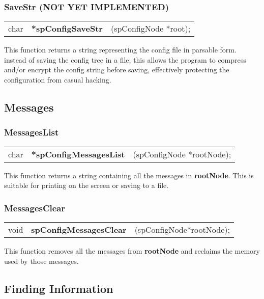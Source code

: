 \documentclass[10pt]{article}
\begin{document}
\subsubsection*{SaveStr (NOT YET IMPLEMENTED)}
\noindent\begin{tabular}{l l l @{}}
char&\textbf{*spConfigSaveStr}&(spConfigNode *root);\\
\end{tabular}

\noindent This function returns a string representing the config file in
parsable form. instead of saving the config tree in a file, this allows the
program to compress and/or encrypt the config string before saving, effectively
protecting the configuration from casual hacking.




\subsection{Messages}

\subsubsection*{MessagesList}
\noindent\begin{tabular}{l l l @{}}
char&\textbf{*spConfigMessagesList}&(spConfigNode *rootNode);\\
\end{tabular}

\noindent This function returns a string containing all the messages in
\textbf{rootNode}.  This is suitable for printing on the screen or saving to a
file.

\subsubsection*{MessagesClear}
\noindent\begin{tabular}{l l l @{}}
void&\textbf{spConfigMessagesClear}&(spConfigNode*rootNode);\\
\end{tabular}

\noindent This function removes all the messages from \textbf{rootNode} and
reclaims the memory used by those messages.



\subsection{Finding Information}
\end{document}
